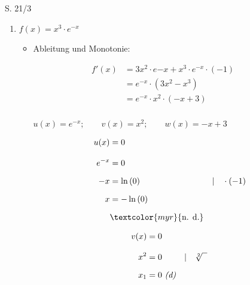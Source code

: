 \begin{Exercise}{S. 21/3}{}
\begin{enumerate}
\begin{enumerate}[label=\alph*)]
{\begin{itemize}[leftmargin=*]
{                        }
                \end{itemize}
                }
            \item[d)] {
                $f(x) = x^{3} \cdot e^{-x}$\\[-2.0ex]
                \begin{itemize}[leftmargin=*]
                    \item Ableitung und Monotonie: \\{
                        \vspace{-2.0ex}
                        \begin{align*}
                            f'(x) &= 3x^{2} \cdot e{-x} + x^{3} \cdot e^{-x} \cdot \left(-1\right) &&\\[1.5ex]
                            &= e^{-x} \cdot \left(3x^{2} - x^{3}\right) && \\[1.5ex]
                            &= e^{-x} \cdot x^{2} \cdot \left(-x + 3\right) &&
                        \end{align*}\\[-1.0ex]
                        $u(x) = e^{-x}; \qquad v(x) = x^{2}; \qquad w(x) = -x + 3$\\[-1.0ex]
                        \begin{minipage}[t]{0.30\linewidth}
                            \begin{align*}
                                u(x) &= 0 &&\\[2.0ex]
                                e^{-x} &= 0 &&\\[1.5ex]
                                -x &= \ln\left(0\right) &&| \quad \cdot \left(-1\right)\\[1.5ex]
                                x &= -\ln\left(0\right) &&\\[1.5ex]
                                & \textcolor{myr}{\text{n. d.}} &&
                            \end{align*}
                        \end{minipage}
                        \hfill
                        \begin{minipage}[t]{0.30\linewidth}
                            \begin{align*}
                                v(x) &= 0 &&\\[2.0ex]
                                x^{2} &= 0 &&| \quad \sqrt[2]{\phantom{x}}\\[1.5ex]
                                x_{1} &= 0 \ \text{\textit{(d)}} &&

\end{align*}
\end{minipage}}
\end{itemize}}
\end{enumerate}
\end{enumerate}
\end{Exercise}
